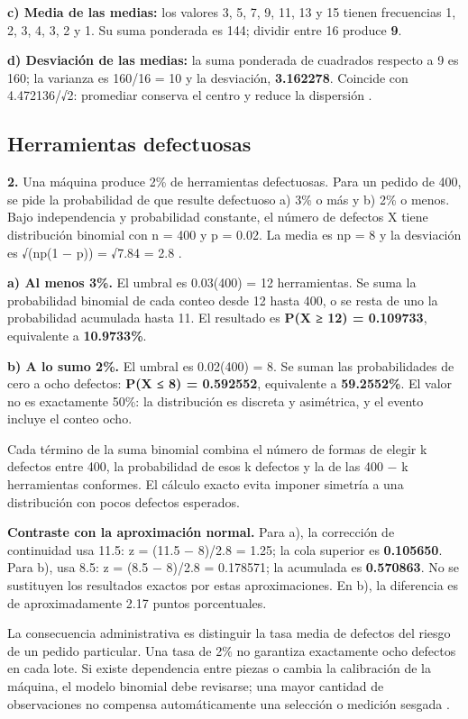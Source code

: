 {\textbf{c) Media de las medias:} los valores 3, 5, 7, 9, 11, 13 y 15 tienen frecuencias 1, 2, 3, 4, 3, 2 y 1. Su suma ponderada es 144; dividir entre 16 produce \textbf{9}.

\textbf{d) Desviación de las medias:} la suma ponderada de cuadrados respecto a 9 es 160; la varianza es 160/16 = 10 y la desviación, \textbf{3.162278}. Coincide con 4.472136/√2: promediar conserva el centro y reduce la dispersión \citep{holmesBusiness2023}.

\clearpage
\subsection{Herramientas defectuosas}
\textbf{2.} Una máquina produce 2\% de herramientas defectuosas. Para un pedido de 400, se pide la probabilidad de que resulte defectuoso a) 3\% o más y b) 2\% o menos. Bajo independencia y probabilidad constante, el número de defectos X tiene distribución binomial con n = 400 y p = 0.02. La media es np = 8 y la desviación es √(np(1 − p)) = √7.84 = 2.8 \citep{holmesBusiness2023}.

\textbf{a) Al menos 3\%.} El umbral es 0.03(400) = 12 herramientas. Se suma la probabilidad binomial de cada conteo desde 12 hasta 400, o se resta de uno la probabilidad acumulada hasta 11. El resultado es \textbf{P(X ≥ 12) = 0.109733}, equivalente a \textbf{10.9733\%}.

\textbf{b) A lo sumo 2\%.} El umbral es 0.02(400) = 8. Se suman las probabilidades de cero a ocho defectos: \textbf{P(X ≤ 8) = 0.592552}, equivalente a \textbf{59.2552\%}. El valor no es exactamente 50\%: la distribución es discreta y asimétrica, y el evento incluye el conteo ocho.

Cada término de la suma binomial combina el número de formas de elegir k defectos entre 400, la probabilidad de esos k defectos y la de las 400 − k herramientas conformes. El cálculo exacto evita imponer simetría a una distribución con pocos defectos esperados.

\textbf{Contraste con la aproximación normal.} Para a), la corrección de continuidad usa 11.5: z = (11.5 − 8)/2.8 = 1.25; la cola superior es \textbf{0.105650}. Para b), usa 8.5: z = (8.5 − 8)/2.8 = 0.178571; la acumulada es \textbf{0.570863}. No se sustituyen los resultados exactos por estas aproximaciones. En b), la diferencia es de aproximadamente 2.17 puntos porcentuales.

La consecuencia administrativa es distinguir la tasa media de defectos del riesgo de un pedido particular. Una tasa de 2\% no garantiza exactamente ocho defectos en cada lote. Si existe dependencia entre piezas o cambia la calibración de la máquina, el modelo binomial debe revisarse; una mayor cantidad de observaciones no compensa automáticamente una selección o medición sesgada \citep{bradley2021}.

}
